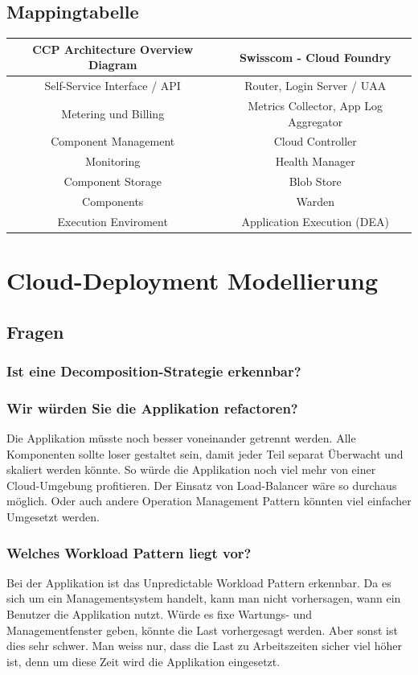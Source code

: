 \subsection{Mappingtabelle}
\begin{table}[H]
\begin{tabular}{|c|c|}
\hline 
\textbf{CCP Architecture Overview Diagram} & \textbf{Swisscom - Cloud Foundry} \\ 
\hline 
Self-Service Interface / API & Router, Login Server / UAA \\ 
\hline 
Metering und Billing & Metrics Collector, App Log Aggregator \\ 
\hline 
Component Management & Cloud Controller \\ 
\hline 
Monitoring & Health Manager \\ 
\hline 
Component Storage & Blob Store \\ 
\hline 
Components & Warden \\ 
\hline 
Execution Enviroment & Application Execution (DEA) \\ 
\hline 
\end{tabular} 
\end{table}

\section{Cloud-Deployment Modellierung}

\subsection{Fragen}
\subsubsection{Ist eine Decomposition-Strategie erkennbar?}
\subsubsection{Wir würden Sie die Applikation refactoren?}
Die Applikation müsste noch besser voneinander getrennt werden. Alle Komponenten sollte loser gestaltet sein, damit jeder Teil separat Überwacht und skaliert werden könnte. So würde die Applikation noch viel mehr von einer Cloud-Umgebung profitieren. Der Einsatz von Load-Balancer wäre so durchaus möglich. Oder auch andere Operation Management Pattern könnten viel einfacher Umgesetzt werden.

\subsubsection{Welches Workload Pattern liegt vor?}
Bei der Applikation ist das Unpredictable Workload Pattern erkennbar. Da es sich um ein Managementsystem handelt, kann man nicht vorhersagen, wann ein Benutzer die Applikation nutzt. Würde es fixe Wartungs- und Managementfenster geben, könnte die Last vorhergesagt werden. Aber sonst ist dies sehr schwer. Man weiss nur, dass die Last zu Arbeitszeiten sicher viel höher ist, denn um diese Zeit wird die Applikation eingesetzt.
